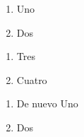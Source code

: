 \documentclass{article}
\begin{document}
	

\begin{enumerate}[label=\emph{\alph*})]
	\item Uno
	\item Dos
\end{enumerate}

\begin{enumerate}[label=\emph{\alph*}),resume]
	\item Tres
	\item Cuatro
\end{enumerate}

\begin{enumerate}[label=\textbf{Idea (\emph{\alph*})}, leftmargin=2cm]
	\item De nuevo Uno
	\item Dos
\end{enumerate}




	
	
\end{document}
